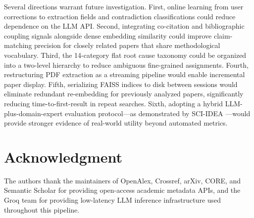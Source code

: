 \documentclass[conference]{IEEEtran}
\begin{document}
Several directions warrant future investigation. First, online learning from
user corrections to extraction fields and contradiction classifications could
reduce dependence on the LLM API. Second, integrating co-citation and
bibliographic coupling signals alongside dense embedding similarity could
improve claim-matching precision for closely related papers that share
methodological vocabulary. Third, the 14-category flat root cause taxonomy
could be organized into a two-level hierarchy to reduce ambiguous
fine-grained assignments. Fourth, restructuring PDF extraction as a
streaming pipeline would enable incremental paper display. Fifth, serializing
FAISS indices to disk between sessions would eliminate redundant
re-embedding for previously analyzed papers, significantly reducing
time-to-first-result in repeat searches. Sixth, adopting a hybrid
LLM-plus-domain-expert evaluation protocol---as demonstrated by
SCI-IDEA \cite{b16}---would provide stronger evidence of real-world utility
beyond automated metrics.

\section*{Acknowledgment}

The authors thank the maintainers of OpenAlex, Crossref, arXiv, CORE, and
Semantic Scholar for providing open-access academic metadata APIs, and the
Groq team for providing low-latency LLM inference infrastructure used
throughout this pipeline.
\end{document}
